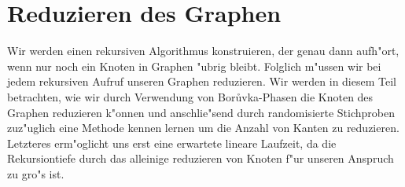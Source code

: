 \section{Reduzieren des Graphen}

Wir werden einen rekursiven Algorithmus konstruieren, der genau dann aufh"ort, 
    wenn nur noch ein Knoten in Graphen "ubrig bleibt. Folglich m"ussen wir
    bei jedem rekursiven Aufruf unseren Graphen reduzieren. Wir werden in 
    diesem Teil betrachten, wie wir durch Verwendung von Bor\r uvka-Phasen die
    Knoten des Graphen reduzieren k"onnen und anschlie"send durch randomisierte
    Stichproben zuz"uglich eine Methode kennen lernen um die Anzahl von Kanten
    zu reduzieren. Letzteres erm"oglicht uns erst eine erwartete lineare 
    Laufzeit, da die Rekursiontiefe durch das alleinige reduzieren von Knoten
    f"ur unseren Anspruch zu gro"s ist.\\




